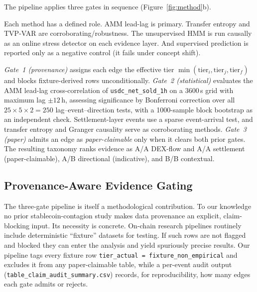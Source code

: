\documentclass[sigconf,anonymous]{acmart}
\begin{document}
The pipeline applies three gates in sequence (Figure~\ref{fig:method}b).

Each method has a defined role. AMM lead-lag is primary. Transfer entropy and TVP-VAR are corroborating/robustness. The unsupervised HMM is run causally as an online stress detector on each evidence layer. And supervised prediction is reported only as a negative control (it fails under concept shift).



\emph{Gate~1 (provenance)} assigns each edge the effective tier
$\min(\text{tier}_i,\text{tier}_j,\text{tier}_f)$ and blocks fixture-derived
rows unconditionally.  \emph{Gate~2 (statistical)} evaluates the AMM lead-lag
cross-correlation of \texttt{usdc\_net\_sold\_1h} on a 3600\,s grid with maximum
lag $\pm12$\,h, assessing significance by Bonferroni correction over all
$25\!\times\!5\!\times\!2 = 250$ lag--event--direction tests, with a
1000-sample block bootstrap as an independent check. Settlement-layer events
use a sparse event-arrival test, and transfer entropy and Granger causality
serve as corroborating methods.  \emph{Gate~3 (paper)} admits an edge as
\emph{paper-claimable} only when it clears both prior gates.  The resulting
taxonomy ranks evidence as A/A DEX-flow and A/A settlement (paper-claimable),
A/B directional (indicative), and B/B contextual.




\subsection{Provenance-Aware Evidence Gating}
\label{sec:provgate}

The three-gate pipeline is itself a methodological contribution. To our
knowledge no prior stablecoin-contagion study makes data provenance an explicit,
claim-blocking input.  Its necessity is concrete.  On-chain research pipelines
routinely include deterministic ``fixture'' datasets for testing. If such rows
are not flagged and blocked they can enter the analysis and yield spuriously
precise results.  Our pipeline tags every fixture row
\texttt{tier\_actual\,=\,fixture\_non\_empirical} and excludes it from any
paper-claimable table, while a per-event audit output
(\texttt{table\_claim\_audit\_summary.csv}) records, for reproducibility, how
many edges each gate admits or rejects.
\end{document}
